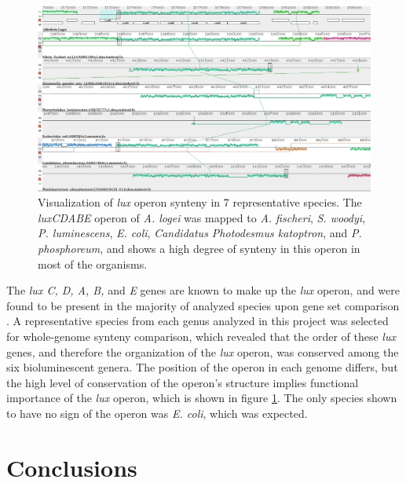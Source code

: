 \documentclass[fleqn,12pt]{wlscirep}
\begin{document}
\begin{figure}[ht]
\includegraphics[width=\textwidth]{synteny.png}
\caption{Visualization of \textit{lux} operon synteny in 7 representative species. The \textit{luxCDABE} operon of \textit{A. logei} was mapped to \textit{A. fischeri}, \textit{S. woodyi}, \textit{P. luminescens}, \textit{E. coli}, \textit{Candidatus Photodesmus katoptron}, and \textit{P. phosphoreum}, and shows a high degree of synteny in this operon in most of the organisms.}
\centering
\label{fig4}
\end{figure}

The \textit{lux C, D, A, B,} and \textit{E} genes are known to make up the \textit{lux} operon, and were found to be present in the majority of analyzed species upon gene set comparison \cite{10}. A representative species from each genus analyzed in this project was selected for whole-genome synteny comparison, which revealed that the order of these \textit{lux} genes, and therefore the organization of the \textit{lux} operon, was conserved among the six bioluminescent genera. The position of the operon in each genome differs, but the high level of conservation of the operon’s structure implies functional importance of the \textit{lux} operon, which is shown in figure \ref{fig4}. The only species shown to have no sign of the operon was \textit{E. coli}, which was expected.  


\section*{Conclusions}
\end{document}
